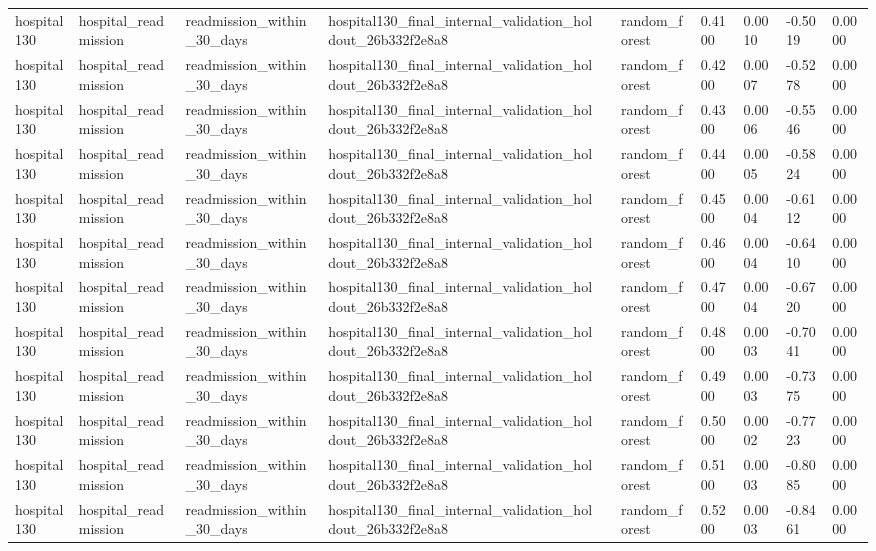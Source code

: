 \begin{tabular}{llllllllll}
hospital130 & hospital\_readmission & readmission\_within\_30\_days & hospital130\_final\_internal\_validation\_holdout\_26b332f2e8a8 &  & random\_forest & 0.4100 & 0.0010 & -0.5019 & 0.0000 \\
hospital130 & hospital\_readmission & readmission\_within\_30\_days & hospital130\_final\_internal\_validation\_holdout\_26b332f2e8a8 &  & random\_forest & 0.4200 & 0.0007 & -0.5278 & 0.0000 \\
hospital130 & hospital\_readmission & readmission\_within\_30\_days & hospital130\_final\_internal\_validation\_holdout\_26b332f2e8a8 &  & random\_forest & 0.4300 & 0.0006 & -0.5546 & 0.0000 \\
hospital130 & hospital\_readmission & readmission\_within\_30\_days & hospital130\_final\_internal\_validation\_holdout\_26b332f2e8a8 &  & random\_forest & 0.4400 & 0.0005 & -0.5824 & 0.0000 \\
hospital130 & hospital\_readmission & readmission\_within\_30\_days & hospital130\_final\_internal\_validation\_holdout\_26b332f2e8a8 &  & random\_forest & 0.4500 & 0.0004 & -0.6112 & 0.0000 \\
hospital130 & hospital\_readmission & readmission\_within\_30\_days & hospital130\_final\_internal\_validation\_holdout\_26b332f2e8a8 &  & random\_forest & 0.4600 & 0.0004 & -0.6410 & 0.0000 \\
hospital130 & hospital\_readmission & readmission\_within\_30\_days & hospital130\_final\_internal\_validation\_holdout\_26b332f2e8a8 &  & random\_forest & 0.4700 & 0.0004 & -0.6720 & 0.0000 \\
hospital130 & hospital\_readmission & readmission\_within\_30\_days & hospital130\_final\_internal\_validation\_holdout\_26b332f2e8a8 &  & random\_forest & 0.4800 & 0.0003 & -0.7041 & 0.0000 \\
hospital130 & hospital\_readmission & readmission\_within\_30\_days & hospital130\_final\_internal\_validation\_holdout\_26b332f2e8a8 &  & random\_forest & 0.4900 & 0.0003 & -0.7375 & 0.0000 \\
hospital130 & hospital\_readmission & readmission\_within\_30\_days & hospital130\_final\_internal\_validation\_holdout\_26b332f2e8a8 &  & random\_forest & 0.5000 & 0.0002 & -0.7723 & 0.0000 \\
hospital130 & hospital\_readmission & readmission\_within\_30\_days & hospital130\_final\_internal\_validation\_holdout\_26b332f2e8a8 &  & random\_forest & 0.5100 & 0.0003 & -0.8085 & 0.0000 \\
hospital130 & hospital\_readmission & readmission\_within\_30\_days & hospital130\_final\_internal\_validation\_holdout\_26b332f2e8a8 &  & random\_forest & 0.5200 & 0.0003 & -0.8461 & 0.0000 \\

\end{tabular}
